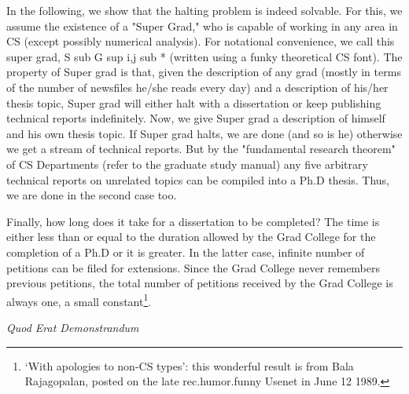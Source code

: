 In the following, we show that the halting problem is indeed solvable. For this, we assume the existence of a "Super Grad," who is capable of working in any area in CS (except possibly numerical analysis). For notational convenience, we call this super grad, S sub G sup i,j sub * (written using a funky theoretical CS font). The property of Super grad is that, given the description of any grad (mostly in terms of the number of newsfiles he/she reads every day) and a description of his/her thesis topic, Super grad will either halt with a dissertation or keep publishing technical reports indefinitely. Now, we give Super grad a description of himself and his own thesis topic. If Super grad halts, we are done (and so is he) otherwise we get a stream of technical reports. But by the "fundamental research theorem" of CS Departments (refer to the graduate study manual) any five arbitrary technical reports on unrelated topics can be compiled into a Ph.D thesis. Thus, we are done in the second case too.

Finally, how long does it take for a dissertation to be completed? The time is either less than or equal to the duration allowed by the Grad College for the completion of a Ph.D or it is greater. In the latter case, infinite number of petitions can be filed for extensions. Since the Grad College never remembers previous petitions, the total number of petitions received by the Grad College is always one, a small constant\footnote{`With apologies to non-CS types': this wonderful result is from Bala Rajagopalan, posted on the late rec.humor.funny Usenet in June 12 1989.}.

\bigskip
\bigskip
\bigskip
\bigskip
\bigskip
\bigskip
\bigskip
\bigskip
\bigskip
\bigskip
\bigskip
\bigskip

\hfill \emph{Quod Erat Demonstrandum}
